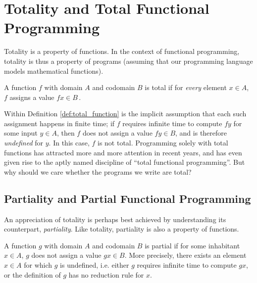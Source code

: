 


\section{Totality and Total Functional Programming}
\label{sec:totality}
Totality is a property of functions. In the context of functional programming,
totality is thus a property of programs (assuming that our programming language
models mathematical functions). 

\begin{definition}
\label{def:total_function}
A function $f$ with domain $A$ and codomain $B$ is total if for \emph{every}
element $x\in A$, $f$ assigns a value
$f x\in B$\,\citep{Turner04totalfunctional}.
\end{definition}

Within Definition \ref{def:total_function} is the implicit assumption that each
such assignment happens in finite time; if $f$ requires infinite time to compute
$f y$ for some input $y\in A$, then $f$ does not assign a value $f y\in B$, and is
therefore \emph{undefined} for $y$. In this case, $f$ is not total. Programming
solely with total functions has attracted more and more attention in recent
years, and has even given rise to the aptly named discipline of ``total
functional programming''. But why should we care whether the programs we write
are total?

\subsection{Partiality and Partial Functional Programming}
An appreciation of totality is perhaps best achieved by understanding its
counterpart, \emph{partiality}. Like totality, partiality is also a property of
functions. 

\begin{definition}
  A function $g$ with domain $A$ and codomain $B$ is partial if for some
  inhabitant $x\in A$, $g$ does not assign a value $g x\in B$. More precisely, there exists
  an element $x\in A$ for which $g$ is undefined, i.e. either $g$
  requires infinite time to compute $g x$, or the definition of $g$ has no
  reduction rule for $x$.
\end{definition}

